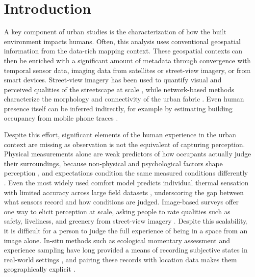 \documentclass[]{interact}
\begin{document}
\section{Introduction}\label{sec:intro}

A key component of urban studies is the characterization of how the built environment impacts humans. 
Often, this analysis uses conventional geospatial information from the data-rich mapping context. 
These geospatial contexts can then be enriched with a significant amount of metadata through convergence with temporal sensor data, imaging data from satellites or street-view imagery, or from smart devices.
Street-view imagery has been used to quantify visual and perceived qualities of the streetscape at scale \citep{Ito2024-fs}, while network-based methods characterize the morphology and connectivity of the urban fabric \citep{Yap2023-xs}.
Even human presence itself can be inferred indirectly, for example by estimating building occupancy from mobile phone traces \citep{Barbour2019-py}.

Despite this effort, significant elements of the human experience in the urban context are missing as observation is not the equivalent of capturing perception.
Physical measurements alone are weak predictors of how occupants actually judge their surroundings, because non-physical and psychological factors shape perception \citep{Castaldo2018-ih}, and expectations condition the same measured conditions differently \citep{Schweiker2020-pw}.
Even the most widely used comfort model predicts individual thermal sensation with limited accuracy across large field datasets \citep{Cheung2019-fs}, underscoring the gap between what sensors record and how conditions are judged.
Image-based surveys offer one way to elicit perception at scale, asking people to rate qualities such as safety, liveliness, and greenery from street-view imagery \citep{Ito2024-fs,Gu2025-fp,Quintana2025-tn}.
Despite this scalability, it is difficult for a person to judge the full experience of being in a space from an image alone.
In-situ methods such as ecological momentary assessment and experience sampling have long provided a means of recording subjective states in real-world settings \citep{Stone1994-he,Christensen2003-zn}, and pairing these records with location data makes them geographically explicit \citep{Kirchner2016-dq}.
\end{document}
